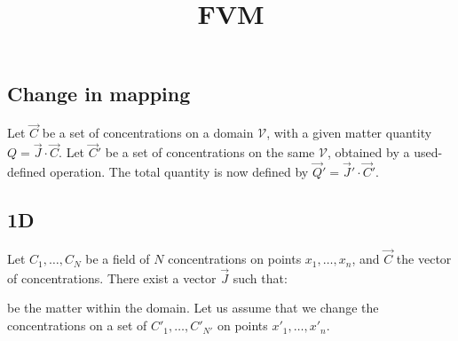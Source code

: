 \documentclass[aps,onecolumn]{revtex4}
\begin{document}
\title{FVM}
\maketitle

\subsection{Change in mapping}
Let $\vec{C}$ be a set of concentrations on a domain $\mathcal{V}$,
with a given matter quantity $Q=\vec{J}\cdot\vec{C}$.
Let $\vec{C}'$ be a set of concentrations on the same $\mathcal{V}$, obtained by
a used-defined operation. The total quantity is now
defined by $\vec{Q}'=\vec{J}' \cdot \vec{C}'$.


\subsection{1D}

\noindent Let $C_1,\ldots,C_N$ be a field of $N$ concentrations on points $x_1,\ldots,x_n$, and $\vec{C}$ the vector of concentrations.
There exist a vector $\vec{J}$ such that:
 	
be the matter within the domain.
Let us assume that we change the concentrations on a set of $C'_1,\ldots,C'_{N'}$ on points $x'_1,\ldots,x'_n$.
\end{document}
